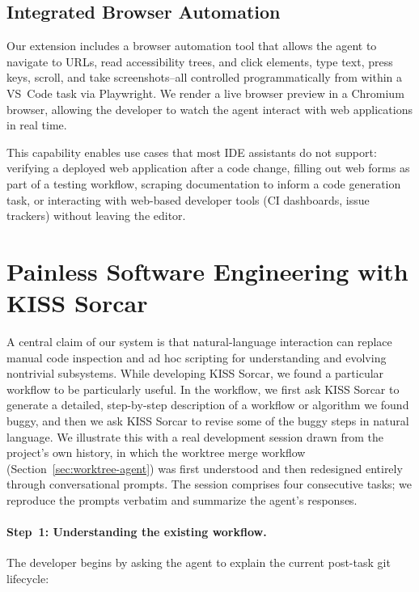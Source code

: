 \documentclass{article}
\begin{document}
\subsection{Integrated Browser Automation}
\label{sec:browser-feature}

Our extension includes a browser automation tool that allows the agent to navigate to URLs, read accessibility trees, and click elements, type text, press keys, scroll, and take screenshots--all controlled programmatically from within a VS~Code task via Playwright. We render a live browser preview in a Chromium browser, allowing the developer to watch the agent interact with web applications in real time.

This capability enables use cases that most IDE assistants do not support: verifying a deployed web application after a code change, filling out web forms as part of a testing workflow, scraping documentation to inform a code generation task, or interacting with web-based developer tools (CI dashboards, issue trackers) without leaving the editor.


\section{Painless Software Engineering with KISS Sorcar}
\label{sec:painless}

A central claim of our system is that natural-language interaction can replace manual code inspection and ad hoc scripting for understanding and evolving nontrivial subsystems.  While developing KISS Sorcar, we found a particular workflow to be particularly useful.  In the workflow, we first ask KISS Sorcar to generate a detailed, step-by-step description of a workflow or algorithm we found buggy, and then we ask KISS Sorcar to revise some of the buggy steps in natural language. We illustrate this with a real development session drawn from the project's own history, in which the worktree merge workflow (Section~\ref{sec:worktree-agent}) was first understood and then redesigned entirely through conversational prompts.  The session comprises four consecutive tasks; we reproduce the prompts verbatim and summarize the agent's responses.

\paragraph{Step~1: Understanding the existing workflow.} The developer begins by asking the agent to explain the current post-task git lifecycle:
\end{document}
